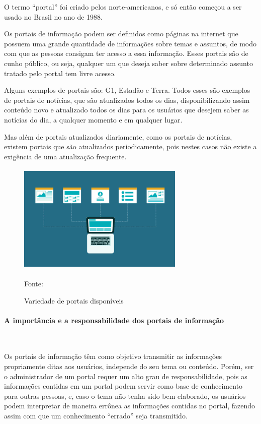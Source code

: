 O termo “portal” foi criado pelos norte-americanos, e só então começou a ser usado no Brasil no ano de 1988.

Os portais de informação podem ser definidos como páginas na internet que possuem uma grande quantidade de informações sobre temas e assuntos, de modo com que as pessoas consigam ter acesso a essa informação. Esses portais são de cunho público, ou seja, qualquer um que deseja saber sobre determinado assunto tratado pelo portal tem livre acesso.

Alguns exemplos de portais são: G1, Estadão e Terra. Todos esses são exemplos de portais de notícias, que são atualizados todos os dias, disponibilizando assim conteúdo novo e atualizado todos os dias para os usuários que desejem saber as notícias do dia, a qualquer momento e em qualquer lugar.

Mas além de portais atualizados diariamente, como os portais de notícias, existem portais que são atualizados periodicamente, pois nestes casos não existe a exigência de uma atualização frequente.
 \begin{figure}[!h]
	\centering
	\caption{Variedade de portais disponíveis}
	\includegraphics[width=300px, height=200px]{./images/2-3.jpg}
		\par{Fonte: \cite{loba}}
\end{figure}
\newpage

\paragraph{A importância e a responsabilidade dos portais de informação}\mbox{}\\
\par
Os portais de informação têm como objetivo transmitir as informações propriamente ditas aos usuários, independe do seu tema ou conteúdo. Porém, ser o administrador de um portal requer um alto grau de responsabilidade, pois as informações contidas em um portal podem servir como base de conhecimento para outras pessoas, e, caso o tema não tenha sido bem elaborado, os usuários podem interpretar de maneira errônea as informações contidas no portal, fazendo assim com que um conhecimento “errado” seja transmitido.

